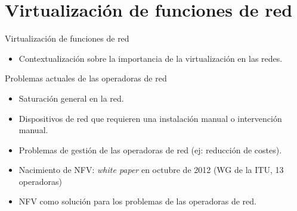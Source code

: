 \documentclass[aspectratio=169,xcolor=dvipsnames]{beamer}
\begin{document}

	\section{Virtualización de funciones de red}
	
	\begin{frame}{Virtualización de funciones de red}
		\begin{itemize}
		    \item Contextualización sobre la importancia de la virtualización en las redes.
		\end{itemize}
		
		\begin{alertblock}{Problemas actuales de las operadoras de red}
		    \begin{itemize}
		        \item Saturación general en la red.
		        \item Dispositivos de red que requieren una instalación manual o intervención manual.
		        \item Problemas de gestión de las operadoras de red (ej: reducción de costes).
		    \end{itemize}
		\end{alertblock}
		
		\begin{itemize}
	        \item Nacimiento de NFV: \textit{white paper} en octubre de 2012 (WG de la ITU, 13 operadoras)
	        \item NFV como solución para los problemas de las operadoras de red.
	    \end{itemize}
	\end{frame}
	
\end{document}

